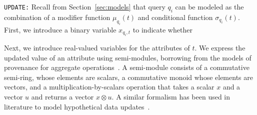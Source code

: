 \smallskip
\noindent
\texttt{UPDATE:}
Recall from Section~\ref{sec:models} that query $q_i$ can be modeled
as the combination of a modifier function $\mu_{q_i}(t)$ and
conditional function $\sigma_{q_i}(t)$. First, we introduce a binary
variable $x_{q_i, t}$ to indicate whether 



Next, we introduce real-valued variables for the attributes of $t$.
We express the updated value
of an attribute using semi-modules, borrowing from the models of
provenance for aggregate operations~\cite{Amsterdamer2011}. A
semi-module consists of a commutative semi-ring, whose elements are
scalars, a commutative monoid whose elements are vectors, and a
multiplication-by-scalars operation that takes a scalar $x$ and a
vector $u$ and returns a vector $x \otimes u$. A similar formalism has
been used in literature to model hypothetical data
updates~\cite{tiresias}.

